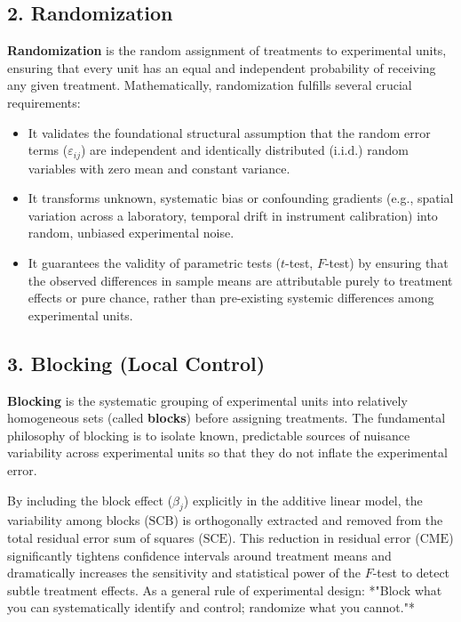 \subsection{2. Randomization}
\textbf{Randomization} is the random assignment of treatments to experimental units, ensuring that every unit has an equal and independent probability of receiving any given treatment. Mathematically, randomization fulfills several crucial requirements:
\begin{itemize}
	\item It validates the foundational structural assumption that the random error terms ($\varepsilon_{ij}$) are independent and identically distributed ($\text{i.i.d.}$) random variables with zero mean and constant variance.
	\item It transforms unknown, systematic bias or confounding gradients (e.g., spatial variation across a laboratory, temporal drift in instrument calibration) into random, unbiased experimental noise.
	\item It guarantees the validity of parametric tests ($t$-test, $F$-test) by ensuring that the observed differences in sample means are attributable purely to treatment effects or pure chance, rather than pre-existing systemic differences among experimental units.
\end{itemize}

\subsection{3. Blocking (Local Control)}
\textbf{Blocking} is the systematic grouping of experimental units into relatively homogeneous sets (called \textbf{blocks}) before assigning treatments. The fundamental philosophy of blocking is to isolate known, predictable sources of nuisance variability across experimental units so that they do not inflate the experimental error.

By including the block effect ($\beta_j$) explicitly in the additive linear model, the variability among blocks ($\text{SCB}$) is orthogonally extracted and removed from the total residual error sum of squares ($\text{SCE}$). This reduction in residual error ($\text{CME}$) significantly tightens confidence intervals around treatment means and dramatically increases the sensitivity and statistical power of the $F$-test to detect subtle treatment effects. As a general rule of experimental design: *"Block what you can systematically identify and control; randomize what you cannot."*

